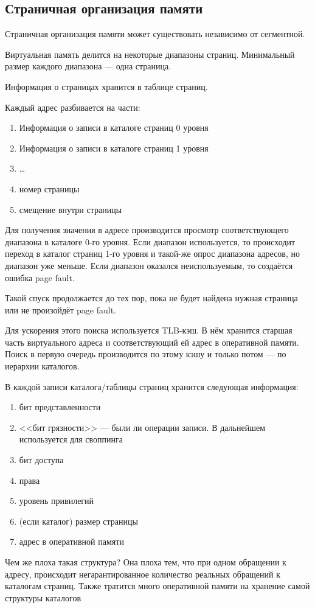 \subsection{Страничная организация памяти}

Страничная организация памяти может существовать независимо от сегментной.

Виртуальная память делится на некоторые диапазоны страниц. Минимальный размер каждого диапазона --- одна страница.

Информация о страницах хранится в таблице страниц.

Каждый адрес разбивается на части:
\begin{enumerate}
\item Информация о записи в каталоге страниц 0 уровня
\item Информация о записи в каталоге страниц 1 уровня
\item \ldots
\item номер страницы
\item смещение внутри страницы
\end{enumerate}

Для получения значения в адресе производится просмотр соответствующего диапазона в каталоге 0-го уровня. Если диапазон используется, то происходит переход в каталог страниц 1-го уровня и такой-же опрос диапазона адресов, но диапазон уже меньше. Если диапазон оказался неиспользуемым, то создаётся ошибка page fault.

Такой спуск продолжается до тех пор, пока не будет найдена нужная страница или не произойдёт page fault.

Для ускорения этого поиска используется TLB-кэш. В нём хранится старшая часть виртуального адреса и соответствующий ей адрес в оперативной памяти. Поиск в первую очередь производится по этому кэшу и только потом --- по иерархии каталогов.

В каждой записи каталога/таблицы страниц хранится следующая информация:
\begin{enumerate}
\item бит представленности
\item <<бит грязности>> --- были ли операции записи. В дальнейшем используется для своппинга
\item бит доступа
\item права
\item уровень привилегий
\item (если каталог) размер страницы
\item адрес в оперативной памяти
\end{enumerate}

Чем же плоха такая структура? Она плоха тем, что при одном обращении к адресу, происходит негарантированное количество реальных обращений к каталогам страниц. Также тратится много оперативной памяти на хранение самой структуры каталогов